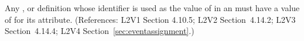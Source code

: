 Any \Compartment, \Species or \Parameter definition whose identifier is
used as the value of  in an \EventAssignment must have a
value of  for its  attribute.  (References: 
L2V1 Section 4.10.5; L2V2 Section~4.14.2; L2V3 Section~4.14.4; L2V4 Section~\ref{sec:eventassignment}.)

